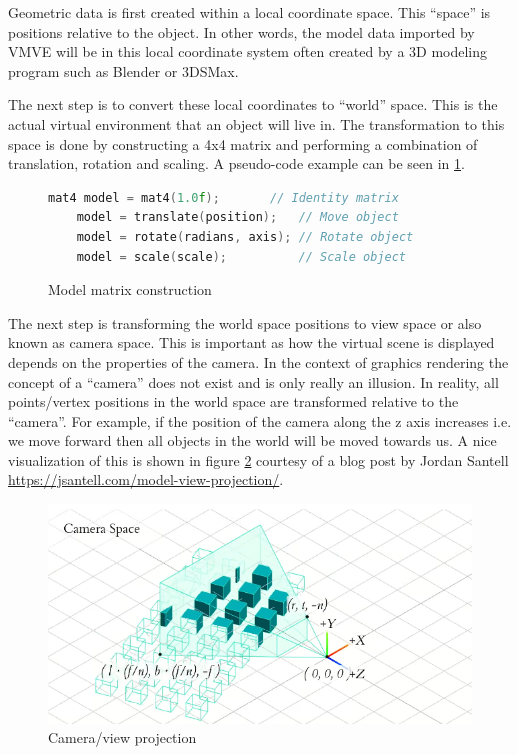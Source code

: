 \documentclass[11pt]{article}
\begin{document}
Geometric data is first created within a local coordinate space. This ``space''
is positions relative to the object. In other words, the model data imported by
VMVE will be in this local coordinate system often created by a 3D modeling
program such as Blender or 3DSMax.

The next step is to convert these local coordinates to ``world'' space. This is
the actual virtual environment that an object will live in. The transformation
to this space is done by constructing a 4x4 matrix and performing a combination
of translation, rotation and scaling. A pseudo-code example can be seen in
\ref{fig:local_to_world}.

\begin{figure}[ht]
  \centering
  \begin{lstlisting}[language=C++]
    mat4 model = mat4(1.0f);       // Identity matrix
    model = translate(position);   // Move object
    model = rotate(radians, axis); // Rotate object
    model = scale(scale);          // Scale object
  \end{lstlisting}
  \caption{Model matrix construction}
  \label{fig:local_to_world}
\end{figure}
  

The next step is transforming the world space positions to view space or also
known as camera space. This is important as how the virtual scene is displayed
depends on the properties of the camera. In the context of graphics rendering
the concept of a ``camera'' does not exist and is only really an illusion. In
reality, all points/vertex positions in the world space are transformed relative
to the ``camera''. For example, if the position of the camera along the z axis
increases i.e. we move forward then all objects in the world will be moved
towards us. A nice visualization of this is shown in figure
\ref{fig:camera_projection} courtesy of a blog post by Jordan Santell
\href{https://jsantell.com/model-view-projection/}{https://jsantell.com/model-view-projection/}.

\begin{figure}[h!]
  \centering
  \includegraphics[width=\textwidth]{images/camera_space.png}
  \caption{Camera/view projection \cite{camera_projection}}
  \label{fig:camera_projection} 
\end{figure}
\end{document}
